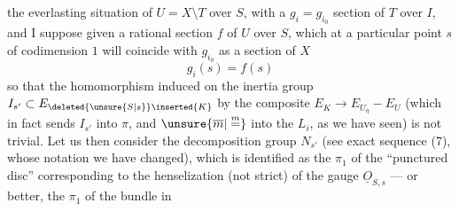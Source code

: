 the everlasting situation of $U=X\setminus T$ over $S$, with a $g_i=g_{i_0}$ section of $T$ over $I$, and I suppose given a rational section $f$ of $U$ over $S$, which at a particular point $s$ of  codimension $1$ will coincide with $g_{i_0}$ as a section of $X$
\[
g_i(s)=f(s)
\]
so that the homomorphism induced on the inertia group $I_{s'}\subset E_{\deleted{\unsure{S|s}}\inserted{K}}$ by the composite $E_K\longrightarrow E_{U_\eta}-E_U$ (which in fact sends $I_{s'}$ into $\pi$, and $\unsure{\overline m|\overset{m}{=}}$ into the $L_i$, as we have seen) is not  trivial. Let us then consider the decomposition group $N_{s'}$ (see exact sequence (7), whose notation we have changed), which is identified as the $\pi_1$ of the ``punctured disc'' corresponding to the henselization (not strict) of the gauge $\underline O_{S,s}$ --- or better, the $\pi_1$ of the bundle in

